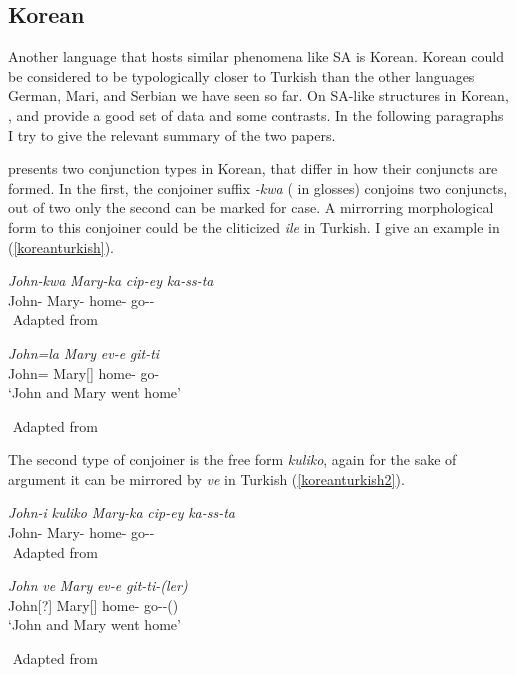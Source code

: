\subsection{Korean}

Another language that hosts similar phenomena like SA is Korean. Korean could be considered to be typologically closer to Turkish than the other languages German, Mari, and Serbian we have seen so far. On SA-like structures in Korean, \cite{yoon2005conjunction}, and \cite{yoon2017lexical} provide a good set of data and some contrasts. In the following paragraphs I try to give the relevant summary of the two papers.

\cite{yoon2005conjunction} presents two conjunction types in Korean, that differ in how their conjuncts are formed. In the first, the conjoiner suffix \textit{-kwa} ({\Conj} in glosses) conjoins two conjuncts, out of two only the second can be marked for case. A mirrorring morphological form to this conjoiner could be the cliticized \textit{ile} in Turkish. I give an example in (\ref{koreanturkish}).

\begin{exe}
    \ex \label{koreanturkish}
    \begin{xlist}
        \ex
        \gll 
        \textit{John-kwa} \textit{Mary-ka} \textit{cip-ey} \textit{ka-ss-ta} \\ John-{\Conj} Mary-{\Nom} home-{\Loc} go-{\Pst}-{\Decl} \\
        ${}$ \hfill Adapted from \cite{yoon2005conjunction}

        \ex 
        \gll 
        \textit{John=la} \textit{Mary} \textit{ev-e} \textit{git-ti} \\ John={\And} Mary[{\Nom}] home-{\Dat} go-{\Pst} \\
        \glt `John and Mary went home'
    \end{xlist}
    ${}$ \hfill Adapted from \cite{yoon2005conjunction}
\end{exe}

The second type of conjoiner is the free form \textit{kuliko}, again for the sake of argument it can be mirrored by \textit{ve} in Turkish (\ref{koreanturkish2}).

\begin{exe}
    \ex \label{koreanturkish2}
    \begin{xlist}
        \ex 
        \gll 
        \textit{John-i} \textit{kuliko} \textit{Mary-ka} \textit{cip-ey} \textit{ka-ss-ta} \\ John-{\Nom} {\And} Mary-{\Nom} home-{\Loc} go-{\Pst}-{\Decl} \\
        ${}$ \hfill Adapted from \cite{yoon2005conjunction}
        
        \ex 
        \gll 
        \textit{John} \textit{ve} \textit{Mary} \textit{ev-e} \textit{git-ti-(ler)} \\ John[?{\Nom}] {\And} Mary[{\Nom}] home-{\Dat} go-{\Pst}-({\Third}{\Pl}) \\
        \glt `John and Mary went home'
    \end{xlist}
    ${}$ \hfill Adapted from \cite{yoon2005conjunction}
\end{exe}


